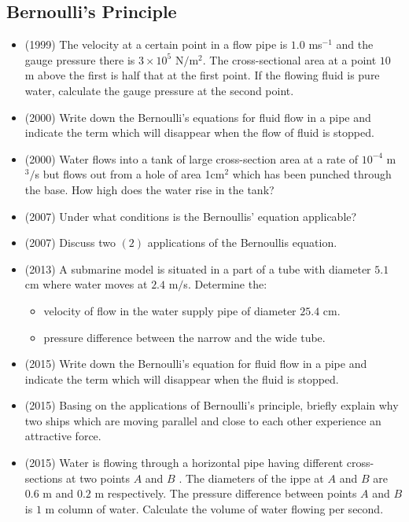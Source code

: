 \documentclass{article}
\begin{document}
\subsection{Bernoulli's Principle}
\begin{itemize}
\item (1999)  The velocity at a certain point in a flow pipe is $ 1.0$ ms$ ^{-1}$ and the gauge pressure there is $ 3 \times 10^5 $ N$/$m$ ^{2}$ ​ . The cross-sectional area at a point $ 10$ m above the first is half that at the first point. If the flowing fluid is pure water, calculate the gauge pressure at the second point.
\item (2000)  Write down the Bernoulli's equations for fluid flow in a pipe and indicate the term which will disappear when the flow of fluid is stopped.
\item (2000)  Water flows into a tank of large cross-section area at a rate of $ 10^{-4}$ m$ ^{3}/$s but flows out from a  hole of area 1cm$ ^{2}$ which has been punched through the base. How high does the water rise in the tank?
\item (2007)  Under what conditions is the Bernoullis’ equation applicable?
\item (2007)  Discuss two $ (2)$ applications of the Bernoullis equation. 
\item (2013)  A submarine model is situated in a part of a tube with diameter $ 5.1$ cm where water moves at $ 2.4$ m$/$s.  Determine the:\begin{itemize}
\item velocity of flow in the water supply pipe of diameter $ 25.4$ cm. 
\item pressure difference between the narrow and the wide tube. 
\end{itemize}
\item (2015)  Write down the Bernoulli’s equation for fluid flow in a pipe and indicate the term which will disappear when the fluid is stopped.
\item (2015)  Basing on the applications of Bernoulli’s principle, briefly explain why two ships which are moving parallel and close to each other experience an attractive force.
\item (2015)  Water is flowing through a horizontal pipe having different cross-sections at two points $ A$ and $ B$ .  The diameters of the ippe at $ A$ and $ B$ are $ 0.6$ m and $ 0.2$ m respectively.   The pressure difference between points $ A$ and $ B$ is $ 1$ m column of water.  Calculate the volume of water flowing per second.

\end{itemize}
\end{document}
